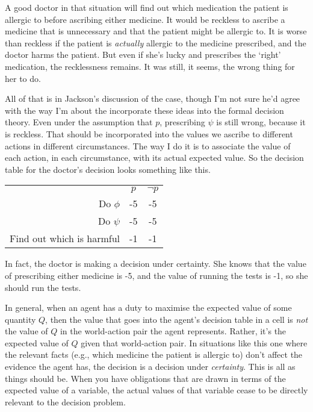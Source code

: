 A good doctor in that situation will find out which medication the patient is allergic to before ascribing either medicine. It would be reckless to ascribe a medicine that is unnecessary and that the patient might be allergic to. It is worse than reckless if the patient is \textit{actually} allergic to the medicine prescribed, and the doctor harms the patient. But even if she's lucky and prescribes the `right' medication, the recklessness remains. It was still, it seems, the wrong thing for her to do.

All of that is in Jackson's discussion of the case, though I'm not sure he'd agree with the way I'm about the incorporate these ideas into the formal decision theory. Even under the assumption that \(p\), prescribing \(\psi\) is still wrong, because it is reckless. That should be incorporated into the values we ascribe to different actions in different circumstances. The way I do it is to associate the value of each action, in each circumstance, with its actual expected value. So the decision table for the doctor's decision looks something like this.

\begin{tabular}{r c c}
 & \(p\) & \(\neg p\) \\
Do \(\phi\) & -5 & -5 \\
Do \(\psi\) & -5 & -5 \\
Find out which is harmful & -1 & -1 \\
\end{tabular}

\noindent In fact, the doctor is making a decision under certainty. She knows that the value of prescribing either medicine is -5, and the value of running the tests is -1, so she should run the tests.

In general, when an agent has a duty to maximise the expected value of some quantity \(Q\), then the value that goes into the agent's decision table in a cell is \textit{not} the value of \(Q\) in the world-action pair the agent represents. Rather, it's the expected value of \(Q\) given that world-action pair. In situations like this one where the relevant facts (e.g., which medicine the patient is allergic to) don't affect the evidence the agent has, the decision is a decision under \textit{certainty}. This is all as things should be. When you have obligations that are drawn in terms of the expected value of a variable, the actual values of that variable cease to be directly relevant to the decision problem.

